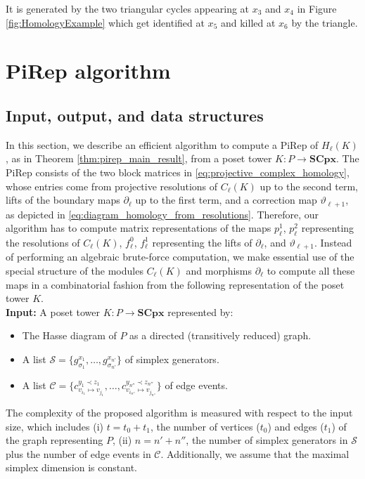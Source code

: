 \documentclass[english,a4paper,nolineno,cleveref]{socg-lipics-v2021}
\begin{document}
It is generated by the two triangular cycles appearing at $x_3$ and $x_4$ in Figure \ref{fig:HomologyExample} which get identified at $x_5$ and killed at $x_6$ by the triangle. 


\section{PiRep algorithm}\label{sec:algorithm}

\subsection{Input, output, and data structures}

In this section, we describe an efficient algorithm to compute a PiRep of $H_\ell(K)$, as in Theorem \ref{thm:pirep_main_result}, from a poset tower $K\colon P\rightarrow\mathbf{SCpx}$. The PiRep consists of the two block matrices in \eqref{eq:projective_complex_homology}, whose entries come from projective resolutions of $C_\ell(K)$ up to the second term, lifts of the boundary maps $\partial_\ell$ up to the first term, and a correction map $\vartheta_{\ell+1}$, as depicted in \eqref{eq:diagram_homology_from_resolutions}.  Therefore, our algorithm has to compute matrix representations of the maps $p_\ell^1$, $p_\ell^2$ representing the resolutions of $C_\ell(K)$, $f_\ell^0$, $f_\ell^1$ representing the lifts of $\partial_\ell$, and $\vartheta_{\ell+1}$. Instead of performing an algebraic brute-force computation, we make essential use of the special structure of the modules $C_\ell(K)$ and morphisms $\partial_\ell$ to compute all these maps in a combinatorial fashion from the following representation of the poset tower $K$. \\ 

\noindent
\textbf{Input:} A poset tower $K\colon P\rightarrow \mathbf{SCpx}$ represented by:
\begin{itemize}
    \item The Hasse diagram of $P$ as a directed (transitively reduced) graph. 
    \item A list 
    $\mathcal{S}=\{g_{\sigma_1}^{x_1},\ldots,g_{\sigma_{n'}}^{x_{n'}}\}$ of simplex generators. 
    \item A list $\mathcal{C}=\{c^{y_1\prec z_1}_{v_{i_1}\mapsto v_{j_1}},\ldots, c^{y_{n''}\prec z_{n''}}_{v_{i_{n''}}\mapsto v_{j_{n''}}}\}$ of edge events. 
\end{itemize}
The complexity of the proposed algorithm is measured with respect to the input size, which includes (i) $t=t_0+t_1$, the number of vertices ($t_0$) and edges ($t_1$) of the graph representing $P$, (ii) $n=n'+n''$, the number of simplex generators in $\mathcal S$ plus the number of edge events in $\mathcal C$. Additionally, we assume that the maximal simplex dimension is constant. \\
\end{document}
